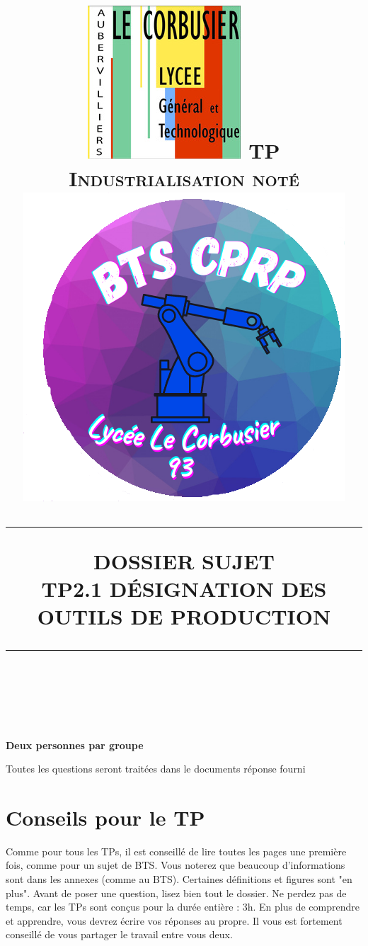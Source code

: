 \documentclass[12pt]{article}
\newcommand{\HRule}[1]{\rule{\linewidth}{#1}}
\begin{document}
 
\title{ \includegraphics[width=0.18\linewidth]{Images/corbu.jpg} \hspace{2cm} \normalsize \textsc{TP Industrialisation noté \hspace{2cm} \includegraphics[width=0.2\linewidth]{Images/logo.png}}
		\\ [2.0cm]
		\HRule{0.5pt} DOSSIER SUJET \\
		\LARGE \textbf{\uppercase{TP2.1 Désignation des outils de production}}
		\HRule{2pt} \\ [0.5cm]}
\maketitle

\textbf{Deux personnes par groupe}\\
\begin{center}
Toutes les questions seront traitées dans le documents réponse fourni
\end{center}










\sectionfont{\scshape}




\newpage




\tableofcontents
\newpage



\section{Conseils pour le TP}
  \bcinfo Comme pour tous les TPs, il est conseillé de lire toutes les pages une première fois, comme pour un sujet de BTS. Vous noterez que beaucoup d'informations sont dans les annexes (comme au BTS). Certaines définitions et figures sont "en plus". Avant de poser une question, lisez bien tout le dossier. Ne perdez pas de temps, car les TPs sont conçus pour la durée entière : 3h. En plus de comprendre et apprendre, vous devrez écrire vos réponses au propre. Il vous est fortement conseillé de vous partager le travail entre vous deux.
\end{document}
